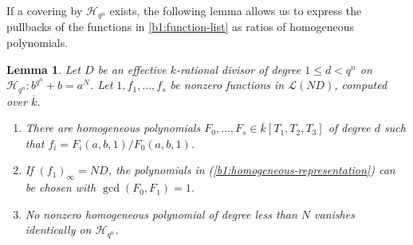 \documentclass[10pt,a4paper]{amsart}
\numberwithin{equation}{section}
\newtheorem{lemma}[theorem]{Lemma}
\begin{document}
If a covering by \(\mathcal H_{q^n}\) exists, the following lemma
allows us to express the pullbacks of the functions in
\eqref{b1:function-list} as ratios of homogeneous polynomials.

\begin{lemma}
\label{b1:polynomial-representation}
Let \(D\) be an effective \(k\)-rational divisor of degree
\(1\le d<q^n\) on \(\mathcal H_{q^n}:b^{q^n}+b=a^N\).
Let \(1,f_1,\ldots,f_s\) be nonzero functions in
\(\mathcal L(ND)\), computed over \(\overline{k}\).
\begin{enumerate}
\item\label{b1:homogeneous-representation}
There are homogeneous polynomials
\(F_0,\ldots,F_s\in\overline{k}[T_1,T_2,T_3]\) of degree \(d\)
such that
\(f_i=F_i(a,b,1)/F_0(a,b,1)\).
\item\label{b1:coprime-representation}
If \((f_1)_\infty=ND\), the polynomials in
\textup{(\ref{b1:homogeneous-representation})} can be chosen with
\(\gcd(F_0,F_1)=1\).
\item\label{b1:low-degree-nonvanishing}
No nonzero homogeneous polynomial of degree less than \(N\)
vanishes identically on \(\mathcal H_{q^n}\).
\end{enumerate}
\end{lemma}
\end{document}

